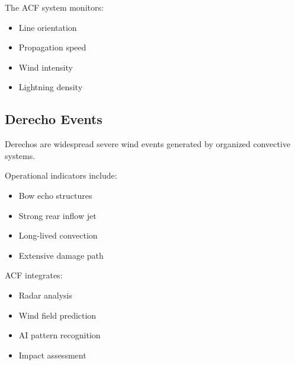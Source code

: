 The ACF system monitors:

\begin{itemize}

\item Line orientation

\item Propagation speed

\item Wind intensity

\item Lightning density

\end{itemize}


\subsection{Derecho Events}

Derechos are widespread severe wind events generated by organized
convective systems.

Operational indicators include:

\begin{itemize}

\item Bow echo structures

\item Strong rear inflow jet

\item Long-lived convection

\item Extensive damage path

\end{itemize}


ACF integrates:

\begin{itemize}

\item Radar analysis

\item Wind field prediction

\item AI pattern recognition

\item Impact assessment

\end{itemize}


